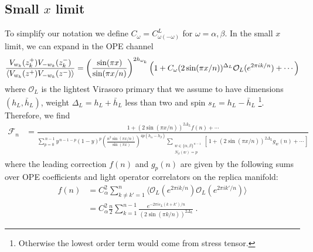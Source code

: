 \documentclass[11pt]{article}
\newcommand{\mO}{\mathcal{O}}
\newcommand{\nn}{\nonumber}
\newcommand{\lb}{\left(}
\newcommand{\rb}{\right)}
\begin{document}

  \subsection*{Small $x$ limit}

  To simplify our notation we define $C_{\omega}=C^{L}_{\omega(-\omega)}$ for
  $\omega=\alpha,\beta$. In the small $x$ limit, we can expand in the OPE
  channel
  \begin{eqnarray}
    \frac{V_{w_k}(z_{k}^{+})V_{-w_k}(z_{k}^{-})}{\braket{V_{w_k}(z^+)V_{-w_k}(z^-)}}=\lb
    \frac{\sin(\pi x)}{\sin(\pi x/n)}\rb^{2h_{\omega_k}}\lb 1+ C_\omega(2\sin(\pi
    x/n))^{\Delta_L}\mO_L(e^{2\pi i k/n})+\cdots\rb\nn
  \end{eqnarray}
  where $\mO_{L}$ is the lightest Virasoro primary that we assume to have
  dimensions $(h_{L},\bar{h}_{L})$, weight $\Delta_{L}=h_{L}+\bar{h}_{L}$ less than
  two and spin $s_{L}=h_{L}-\bar{h}_{L}$ \footnote{Otherwise the lowest order
  term would come from stress tensor.}. Therefore, we find
  \begin{align}
    \label{eq:F_n}\mathcal{F}_{n} & =\frac{\,1+(2\sin(\pi x/n))^{2\Delta_L}f(n)+\cdots\,}{\displaystyle \sum_{p=0}^{\,n-1}y^{\,n-1-p}(1-y)^{p}\left(\frac{n^2\sin(\pi x/n)}{\sin(\pi x)}\right)^{4p(h_\alpha-h_\beta)}\sum_{\substack{w\in\{\alpha,\beta\}^{\,n-1}\\ N_\beta(w)=p}}\left[\,1+(2\sin(\pi x/n))^{2\Delta_L}g_{w}(n)+\cdots\,\right] }
  \end{align}
  where the leading correction $f(n)$ and $g_{p}(n)$ are given by the following sums
  over OPE coefficients and light operator correlators on the replica manifold:
  \begin{align}\label{eq: OPE of two spinful primaries}
    f(n) & =C_{\alpha}^{2}\sum_{k\neq k'=1}^{n}\langle \mO_{L}(e^{2\pi i k/n})\mO_{L}(e^{2\pi i k'/n})\rangle \nn    \\
         & =C_{\alpha}^{2}\frac{n}{2}\sum_{k=1}^{n-1}\frac{e^{-2\pi i s_L(k+k')/n}}{(2\sin(\pi k/n))^{2\Delta_L}}\ .
  \end{align}
\end{document}
